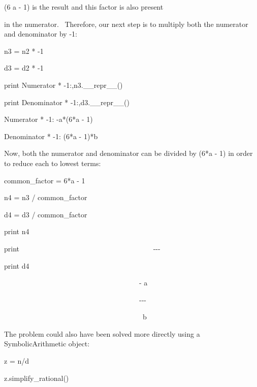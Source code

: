 \documentclass[12pt,twoside]{book}
\begin{document}
(6 a {}- 1) is the result and this factor is also present

in the numerator. \ Therefore, our next step is to multiply both the
numerator and denominator by {}-1:

{\textquotedbl}{\textquotedbl}{\textquotedbl}

n3 = n2 * {}-1

d3 = d2 * {}-1

print {\textquotedbl}Numerator * {}-1:{\textquotedbl},n3.\_\_repr\_\_()

print {\textquotedbl}Denominator *
{}-1:{\textquotedbl},d3.\_\_repr\_\_()

{\textbar}

Numerator * {}-1: {}-a*(6*a {}- 1)

Denominator * {}-1: (6*a {}- 1)*b


\bigskip

{\textquotedbl}{\textquotedbl}{\textquotedbl}

Now, both the numerator and denominator can be divided by (6*a {}- 1) in
order to reduce each to lowest terms:

{\textquotedbl}{\textquotedbl}{\textquotedbl}

common\_factor = 6*a {}- 1

n4 = n3 / common\_factor

d4 = d3 / common\_factor

print n4

print {\textquotedbl}
\ \ \ \ \ \ \ \ \ \ \ \ \ \ \ \ \ \ \ \ \ \ \ \ \ \ \ \ \ \ \ \ \ \ \ \ \ {}-{}-{}-{\textquotedbl}

print d4

{\textbar}

\ \ \ \ \ \ \ \ \ \ \ \ \ \ \ \ \ \ \ \ \ \ \ \ \ \ \ \ \ \ \ \ \ \ \ \ \ \ {}-
a

\ \ \ \ \ \ \ \ \ \ \ \ \ \ \ \ \ \ \ \ \ \ \ \ \ \ \ \ \ \ \ \ \ \ \ \ \ \ {}-{}-{}-

\ \ \ \ \ \ \ \ \ \ \ \ \ \ \ \ \ \ \ \ \ \ \ \ \ \ \ \ \ \ \ \ \ \ \ \ \ \ \ b


\bigskip

{\textquotedbl}{\textquotedbl}{\textquotedbl}

The problem could also have been solved more directly using a
SymbolicArithmetic object:

{\textquotedbl}{\textquotedbl}{\textquotedbl}

z = n/d

z.simplify\_rational()
\end{document}
